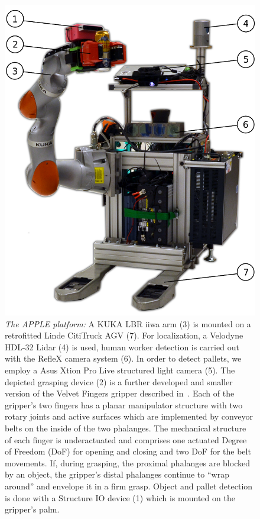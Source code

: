 \begin{figure}[t!]
\begin{center}
\includegraphics[width =0.85\linewidth]{figs/apple_demonstrator}
\caption{\textit{The APPLE platform:} A KUKA LBR iiwa arm (3) is mounted on a retrofitted Linde
  CitiTruck AGV (7). For localization, a Velodyne HDL-32 Lidar (4) is used, human worker detection
  is carried out with the RefleX camera system (6). In order to detect pallets, we employ a Asus
  Xtion Pro Live structured light camera (5). The depicted grasping device (2) is a further
  developed and smaller version of the Velvet Fingers gripper described in~\cite{Tinc12}. Each of
  the gripper’s two fingers has a planar manipulator structure with two rotary joints and active
  surfaces which are implemented by conveyor belts on the inside of the two phalanges. The
  mechanical structure of each finger is underactuated and comprises one actuated Degree of Freedom
  (DoF) for opening and closing and two DoF for the belt movements. If, during grasping, the
  proximal phalanges are blocked by an object, the gripper’s distal phalanges continue to ``wrap
  around'' and envelope it in a firm grasp. Object and pallet detection is done with a Structure IO
  device (1) which is mounted on the gripper's palm.}
\label{fig:robot}
\vspace{-0.5cm}
\end{center}
\end{figure}


